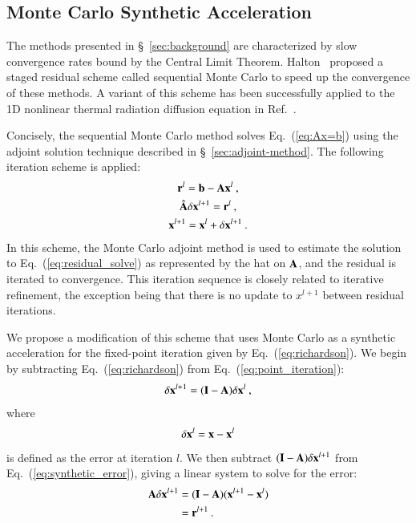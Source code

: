 \documentclass[preprint,12pt]{elsarticle}
\newcommand{\vA}{\ensuremath{\ve{A}}}
\newcommand{\vb}{\ensuremath{\ve{b}}}
\newcommand{\vx}{\ensuremath{\ve{x}}}
\newcommand{\vr}{\ensuremath{\ve{r}}}
\newcommand{\vI}{\ensuremath{\ve{I}}}
\begin{document}
\subsection{Monte Carlo Synthetic Acceleration}
\label{sec:iter-refin-monte}

The methods presented in \S~\ref{sec:background} are characterized by slow
convergence rates bound by the Central Limit Theorem.
Halton~\cite{halton_1962,halton_1994} proposed a staged residual scheme called
sequential Monte Carlo to speed up the convergence of these methods.  A
variant of this scheme has been successfully applied to the 1D nonlinear
thermal radiation diffusion equation in Ref.~\cite{evans_2003}.

Concisely, the sequential Monte Carlo method solves Eq.~(\ref{eq:Ax=b}) using
the adjoint solution technique described in \S~\ref{sec:adjoint-method}.  The
following iteration scheme is applied:
\begin{subequations}
  \begin{gather}
    \vr^{l} = \vb - \vA\vx^{l}\:, \\ \hat{\vA}\delta\vx^{l+1} =
    \vr^{l}\:, \label{eq:residual_solve}\\ \vx^{l+1} = \vx^{l} +
    \delta\vx^{l+1}\:.
  \end{gather}
  \label{eq:sequential_mc}
\end{subequations}
In this scheme, the Monte Carlo adjoint method is used to estimate the
solution to Eq.~(\ref{eq:residual_solve}) as represented by the hat on $\vA$,
and the residual is iterated to convergence.  This iteration sequence is
closely related to iterative refinement, the exception being that there is no
update to $x^{l+1}$ between residual iterations.

We propose a modification of this scheme that uses Monte Carlo as a synthetic
acceleration \cite{dsa} for the fixed-point iteration given by
Eq.~(\ref{eq:richardson}). We begin by subtracting Eq.~(\ref{eq:richardson})
from Eq.~(\ref{eq:point_iteration}):
\begin{equation}
  \delta \vx^{l+1} = (\vI - \vA)\delta \vx^{l}\:,
  \label{eq:synthetic_error}
\end{equation}
where
\begin{equation}
  \delta \vx^{l} = \vx - \vx^{l}
\end{equation}
is defined as the error at iteration $l$. We then subtract $(\vI-\vA)
\delta \vx^{l+1}$ from Eq.~(\ref{eq:synthetic_error}), giving a linear
system to solve for the error:
\begin{equation}
  \begin{split}
    \vA \delta \vx^{l+1} &= (\vI - \vA)(\vx^{l+1} - \vx^{l}) \\ &=
    \vr^{l+1}\:.
  \end{split}
  \label{eq:synthetic_error2}
\end{equation}
\end{document}
